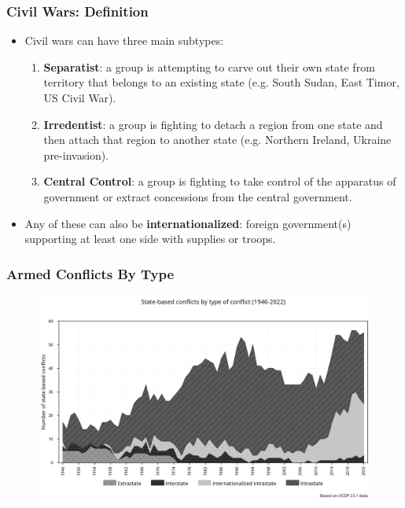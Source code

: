 \documentclass{beamer}
\begin{document}
\begin{frame} 
	\frametitle{\LARGE{Civil Wars: Definition}}
	\begin{itemize}
		\item Civil wars can have three main subtypes:
		\begin{enumerate}
			\item \textbf{Separatist}: a group is attempting to carve out their own state from territory that belongs to an existing state (e.g. South Sudan, East Timor, US Civil War). \pause
			\item \textbf{Irredentist}: a group is fighting to detach a region from one state and then attach that region to another state (e.g. Northern Ireland, Ukraine pre-invasion). \pause
			\item \textbf{Central Control}: a group is fighting to take control of the apparatus of government or extract concessions from the central government. \pause
		\end{enumerate}
	\item Any of these can also be \textbf{internationalized}: foreign government(s) supporting at least one side with supplies or troops.
	\end{itemize}
\end{frame}

\begin{frame} 
	\frametitle{\LARGE{Armed Conflicts By Type}}
	\begin{figure}[ht!]
		\centering
		\includegraphics[width=\textwidth,height=\textheight,keepaspectratio]{armedconf_by_type.png}
	\end{figure}
\end{frame}
\end{document}
